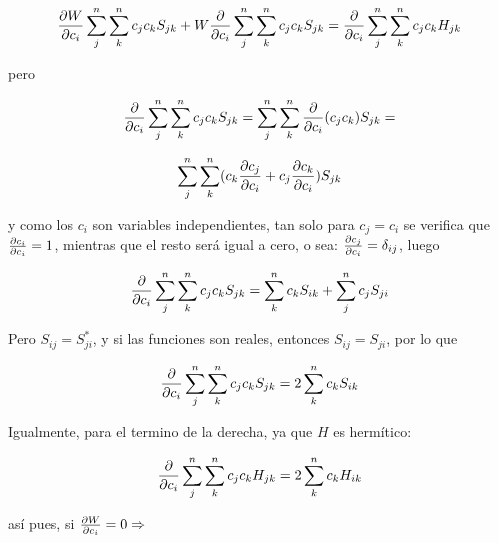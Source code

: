\documentclass[a4paper,openright,12pt, oneside]{book}
\begin{document}
\begin{displaymath}{
    {\partial W \over \partial c_{i}} \sum^{n}_{j} \sum^{n}_{k} c_j c_k S_{jk} + W {\partial \over \partial c_{i}}}
\sum^{n}_{j} \sum^{n}_{k} c_{j} c_{k} S_{jk} =  {{ \partial \over \partial c_i} \sum^{n}_{j} \sum^{n}_{k} c_{j} c_{k} H_{jk}}
\end{displaymath}


pero

\begin{displaymath}
{\partial \over \partial c_{i}} \sum^{n}_{j} \sum^{n}_{k} c_{j} c_{k}
S_{jk} = \sum^{n}_{j} \sum^{n}_{k} {\partial \over \partial c_{i}}
(c_{j} c_{k}) S_{jk} =
\end{displaymath}

\begin{displaymath}
\sum^{n}_{j} \sum^{n}_{k} (c_{k}{\partial c_j\over \partial c_{i}}
+ c_{j} {\partial c_k\over \partial c_{i}} ) S_{jk}
\end{displaymath}




y como los $c_{i}$ son variables independientes, tan solo para $c_{j}=c_{i}$ se verifica que  ${\partial c_i\over \partial c_i} =
1$, mientras que el resto ser\'a igual a cero, o sea:  ${\partial
c_j\over \partial c_i} = \delta _{ij}$, luego

 \begin{displaymath}
{\partial \over \partial c_{i}} \sum^{n}_{j} \sum^{n}_{k} c_{j} c_{k}
S_{jk} = \sum^{n}_{k} c_{k} S_{ik} + \sum^{n}_{j} c_{j} S_{ji}
\end{displaymath}



Pero  $S_{ij} = S^{*}_{ji}$, y si las funciones son reales, entonces $S_{ij}=S_{ji}$, por lo que

\begin{displaymath}{\partial \over \partial c_{i}} \sum^{n}_{j} \sum^{n}_{k} c_{j} c_{k}
S_{jk} = 2 \sum^{n}_{k} c_{k} S_{ik} \end{displaymath}

Igualmente, para el termino de la derecha, ya que $H$ es herm\'itico:


\begin{displaymath}{\partial \over \partial c_{i}} \sum^{n}_{j} \sum^{n}_{k} c_{j} c_{k}
H_{jk} = 2 \sum^{n}_{k} c_{k} H_{ik} \end{displaymath}

as\'i pues, si         ${\partial W\over \partial c_{i}} = 0 \Rightarrow
$
\end{document}
